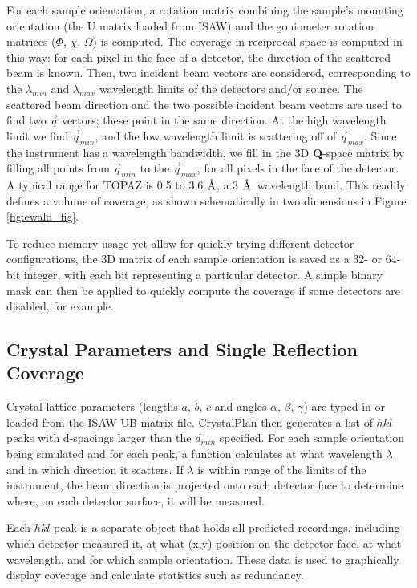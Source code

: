 \documentclass[final]{iucr}              %
\newcommand{\ang}{$\mathrm{\AA} $}
\begin{document}
For each sample orientation, a rotation matrix combining the sample's mounting
orientation (the U matrix loaded from ISAW) and the goniometer rotation matrices
($\Phi$, $\chi$, $\Omega$) is computed. The coverage in reciprocal space is
computed in this way: for each pixel in the face of a detector, the direction of
the scattered beam is known. Then, two incident beam vectors are considered,
corresponding to the $\lambda_{min}$ and $\lambda_{max}$ wavelength limits
of the detectors and/or source. The scattered beam direction and the two possible incident beam vectors
are used to find two $\overrightarrow q$ vectors; these point in the
same direction. At the high wavelength limit we find $\overrightarrow q_{min}$,
and the low wavelength limit is scattering off of $\overrightarrow q_{max}$.
Since the instrument has a wavelength bandwidth, we fill in the 3D {\bf Q}-space
matrix by filling all points from $\overrightarrow q_{min}$ to the 
$\overrightarrow q_{max}$, for all pixels in the face of the detector.
A typical range for TOPAZ is 0.5 to 3.6 \ang, a 3 \ang\ wavelength band.
This readily defines a volume of coverage, as shown schematically in
two dimensions in Figure \ref{fig:ewald_fig}.


To reduce memory usage yet allow for quickly trying different detector
configurations, the 3D matrix of each sample orientation is saved as a 32- or
64-bit integer, with each bit representing a particular detector. A simple
binary mask can then be applied to quickly compute the coverage if some
detectors are disabled, for example.          




\subsection{Crystal Parameters and Single Reflection Coverage}

Crystal lattice parameters (lengths $a$, $b$, $c$ and angles $\alpha$, $\beta$,
$\gamma$) are typed in or loaded from the ISAW UB matrix file. CrystalPlan then
generates a list of $hkl$ peaks with d-spacings larger than the $d_{min}$
specified. For each sample orientation being simulated and for each peak, a function calculates at
what wavelength $\lambda$ and in which direction it scatters. If $\lambda$ 
is within range of the limits of the instrument, the beam direction is projected
onto each detector face to determine where, on each detector surface, it will be
measured. 
 
Each $hkl$ peak is a separate object that holds all predicted
recordings, including which detector measured it, at what (x,y) position on the
detector face, at what wavelength, and for which sample orientation. These data
is used to  graphically display coverage and calculate statistics such as
redundancy. 
\end{document}
